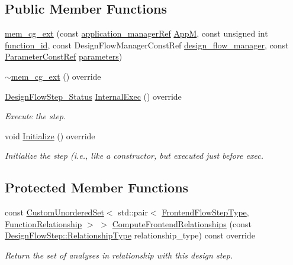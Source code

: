 \subsection*{Public Member Functions}
\begin{DoxyCompactItemize}
\item 
\hyperlink{classmem__cg__ext_ac600df8f688939e3794a3ea7dcac4151}{mem\+\_\+cg\+\_\+ext} (const \hyperlink{application__manager_8hpp_a04ccad4e5ee401e8934306672082c180}{application\+\_\+manager\+Ref} \hyperlink{classFrontendFlowStep_a0ac0d8db2a378416583f51c4faa59d15}{AppM}, const unsigned int \hyperlink{classFunctionFrontendFlowStep_a58ef2383ad1a212a8d3f396625a4b616}{function\+\_\+id}, const Design\+Flow\+Manager\+Const\+Ref \hyperlink{classDesignFlowStep_ab770677ddf087613add30024e16a5554}{design\+\_\+flow\+\_\+manager}, const \hyperlink{Parameter_8hpp_a37841774a6fcb479b597fdf8955eb4ea}{Parameter\+Const\+Ref} \hyperlink{classDesignFlowStep_a802eaafe8013df706370679d1a436949}{parameters})
\item 
\hyperlink{classmem__cg__ext_a719c9d69a2b61e5879acb0834ec913b6}{$\sim$mem\+\_\+cg\+\_\+ext} () override
\item 
\hyperlink{design__flow__step_8hpp_afb1f0d73069c26076b8d31dbc8ebecdf}{Design\+Flow\+Step\+\_\+\+Status} \hyperlink{classmem__cg__ext_aec306532229120aabaacf2a9602648c2}{Internal\+Exec} () override
\begin{DoxyCompactList}\small\item\em Execute the step. \end{DoxyCompactList}\item 
void \hyperlink{classmem__cg__ext_a5899173716bbaa87a39603a1847f4ff6}{Initialize} () override
\begin{DoxyCompactList}\small\item\em Initialize the step (i.\+e., like a constructor, but executed just before exec. \end{DoxyCompactList}\end{DoxyCompactItemize}
\subsection*{Protected Member Functions}
\begin{DoxyCompactItemize}
\item 
const \hyperlink{classCustomUnorderedSet}{Custom\+Unordered\+Set}$<$ std\+::pair$<$ \hyperlink{frontend__flow__step_8hpp_afeb3716c693d2b2e4ed3e6d04c3b63bb}{Frontend\+Flow\+Step\+Type}, \hyperlink{classFrontendFlowStep_af7cf30f2023e5b99e637dc2058289ab0}{Function\+Relationship} $>$ $>$ \hyperlink{classmem__cg__ext_a86e9ef6358e3a59fe7d9e4cd7c3700ef}{Compute\+Frontend\+Relationships} (const \hyperlink{classDesignFlowStep_a723a3baf19ff2ceb77bc13e099d0b1b7}{Design\+Flow\+Step\+::\+Relationship\+Type} relationship\+\_\+type) const override
\begin{DoxyCompactList}\small\item\em Return the set of analyses in relationship with this design step. \end{DoxyCompactList}\end{DoxyCompactItemize}

